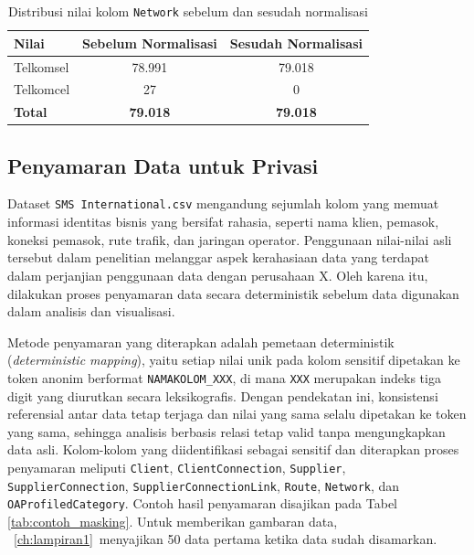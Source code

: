 \begin{table}[h!]
\centering
\caption{Distribusi nilai kolom \texttt{Network} sebelum dan sesudah normalisasi}
\label{tab:network_normalisasi}
\begin{tabular}{lcc}
\toprule
\textbf{Nilai} & \textbf{Sebelum Normalisasi} & \textbf{Sesudah Normalisasi} \\
\midrule
Telkomsel  & 78.991 & 79.018 \\
Telkomcel  & 27     & 0      \\
\midrule
\textbf{Total} & \textbf{79.018} & \textbf{79.018} \\
\bottomrule
\end{tabular}
\end{table}



\subsection{Penyamaran Data untuk Privasi}
\label{subsubsec:data_masking}

Dataset \texttt{SMS International.csv} mengandung sejumlah kolom yang memuat informasi identitas bisnis yang bersifat rahasia, seperti nama klien, pemasok, koneksi pemasok, rute trafik, dan jaringan operator. Penggunaan nilai-nilai asli tersebut dalam penelitian melanggar aspek kerahasiaan data yang terdapat dalam perjanjian penggunaan data dengan perusahaan X. Oleh karena itu, dilakukan proses penyamaran data secara deterministik sebelum data digunakan dalam analisis dan visualisasi.

Metode penyamaran yang diterapkan adalah pemetaan deterministik (\textit{deterministic mapping}), yaitu setiap nilai unik pada kolom sensitif dipetakan ke token anonim berformat \texttt{NAMAKOLOM\_XXX}, di mana \texttt{XXX} merupakan indeks tiga digit yang diurutkan secara leksikografis. Dengan pendekatan ini, konsistensi referensial antar data tetap terjaga dan nilai yang sama selalu dipetakan ke token yang sama, sehingga analisis berbasis relasi tetap valid tanpa mengungkapkan data asli. Kolom-kolom yang diidentifikasi sebagai sensitif dan diterapkan proses penyamaran meliputi
\texttt{Client}, \texttt{ClientConnection}, \texttt{Supplier}, \texttt{SupplierConnection}, \texttt{SupplierConnectionLink}, \texttt{Route}, \texttt{Network}, dan \texttt{OAProfiledCategory}. Contoh hasil penyamaran disajikan pada Tabel \ref{tab:contoh_masking}.  Untuk memberikan gambaran data, ~\autoref{ch:lampiran1}\ menyajikan 50 data pertama ketika data sudah disamarkan.

